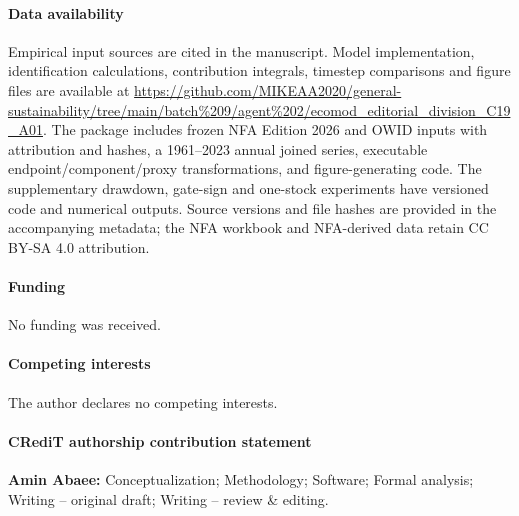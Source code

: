 \documentclass[preprint,12pt,authoryear]{elsarticle}
\begin{document}
\paragraph{Data availability} Empirical input sources are cited in the manuscript. Model implementation, identification calculations, contribution integrals, timestep comparisons and figure files are available at \url{https://github.com/MIKEAA2020/general-sustainability/tree/main/batch%209/agent%202/ecomod_editorial_division_C19_A01}. The package includes frozen NFA Edition 2026 and OWID inputs with attribution and hashes, a 1961--2023 annual joined series, executable endpoint/component/proxy transformations, and figure-generating code. The supplementary drawdown, gate-sign and one-stock experiments have versioned code and numerical outputs. Source versions and file hashes are provided in the accompanying metadata; the NFA workbook and NFA-derived data retain CC BY-SA 4.0 attribution.

\paragraph{Funding} No funding was received.

\paragraph{Competing interests} The author declares no competing interests.

\paragraph{CRediT authorship contribution statement} \textbf{Amin Abaee:} Conceptualization; Methodology; Software; Formal analysis; Writing -- original draft; Writing -- review \& editing.
\end{document}
